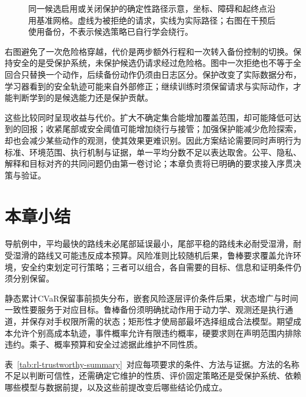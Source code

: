 \begin{figure}[htbp]
  \centering
  
  \caption{同一候选启用或关闭保护的确定性路径示意，坐标、障碍和起终点沿用基准网格。虚线为被拒绝的请求，实线为实际路径；右图在干预后使用备份，不表示候选策略已自行学会绕行。}
  \label{fig:rl-trustworthy-protected-path}
\end{figure}

右图避免了一次危险格穿越，代价是两步额外行程和一次转入备份控制的切换。保持安全的是受保护系统，未保护候选仍请求经过危险格。图中一次拒绝也不等于全回合只替换一个动作，后续备份动作仍须由日志区分。保护改变了实际数据分布，学习器看到的安全轨迹可能来自外部修正；继续训练时须保留请求与实际动作，才能判断学到的是候选能力还是保护贡献。

这些比较同时呈现收益与代价。扩大不确定集合能增加覆盖范围，却可能降低可达到的回报；收紧尾部或安全阈值可能增加绕行与接管；加强保护能减少危险探索，却也会减少某些动作的观测，使其效果更难识别。因此方案结论需要同时声明行为标准、环境范围、执行机制与证据，单一平均分数不足以表达取舍。公平、隐私、解释和目标对齐的共同问题仍由第一卷讨论；本章负责将已明确的要求接入序贯决策与验证。

\section{本章小结}
\label{sec:rl-trustworthy-summary}

导航例中，平均最快的路线未必尾部延误最小，尾部平稳的路线未必耐受湿滑，耐受湿滑的路线又可能违反成本预算。风险准则比较随机后果，鲁棒要求覆盖允许环境，安全约束划定可行策略；三者可以组合，各自需要的目标、信息和证明条件仍须分别保留。

静态累计CVaR保留事前损失分布，嵌套风险逐层评价条件后果，状态增广与时间一致性要服务于对应目标。鲁棒备份须明确扰动作用于动力学、观测还是执行通道，并保存对手权限所需的状态；矩形性才使局部最坏选择组成合法模型。期望成本允许个别高成本轨迹，事件概率允许有限违约概率，硬要求则在声明范围内排除违约。乘子、概率预算和安全过滤据此维护不同性质。

表~\ref{tab:rl-trustworthy-summary}~对应每项要求的条件、方法与证据。方法的名称不足以判断可信性，还需确定它维护的性质、评价固定策略还是受保护系统、依赖哪些模型与数据前提，以及这些前提改变后哪些结论仍成立。

